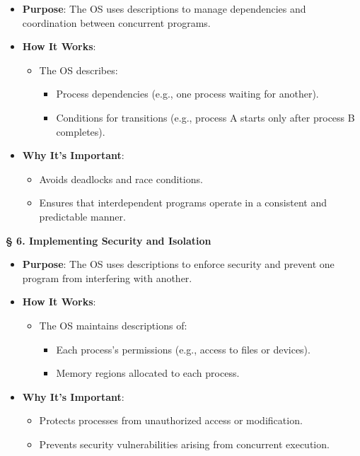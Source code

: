 \documentclass[a4paper]{book}
\newcommand{\sfbf}[1]{{\normalsize\textsf{\textbf{§ #1}}}}
\begin{document}
\begin{itemize}
\item 
\textbf{Purpose}: The OS uses descriptions to manage dependencies and coordination between concurrent programs.

\item 
\textbf{How It Works}:
\begin{itemize}
\item 
The OS describes:
\begin{itemize}
\item 
Process dependencies (e.g., one process waiting for another).

\item 
Conditions for transitions (e.g., process A starts only after process B completes).

\end{itemize}

\end{itemize}

\item 
\textbf{Why It's Important}:
\begin{itemize}
\item 
Avoids deadlocks and race conditions.

\item 
Ensures that interdependent programs operate in a consistent and predictable manner.

\end{itemize}

\end{itemize}
\hrulefill

\sfbf{6. Implementing Security and Isolation}

\begin{itemize}
\item 
\textbf{Purpose}: The OS uses descriptions to enforce security and prevent one program from interfering with another.

\item 
\textbf{How It Works}:
\begin{itemize}
\item 
The OS maintains descriptions of:
\begin{itemize}
\item 
Each process's permissions (e.g., access to files or devices).

\item 
Memory regions allocated to each process.

\end{itemize}

\end{itemize}

\item 
\textbf{Why It's Important}:
\begin{itemize}
\item 
Protects processes from unauthorized access or modification.

\item 
Prevents security vulnerabilities arising from concurrent execution.

\end{itemize}

\end{itemize}
\hrulefill
\end{document}
